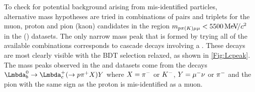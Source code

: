 

  
To check for potential background arising from mis-identified particles, alternative mass hypotheses are tried in combinations of pairs and triplets for the muon, proton and pion (kaon) candidates in the region $m_{p\pi({K})\mu\mu}<5500{\mathrm{\,Me\kern -0.1em V\!/}c^2}$ in the \Lbpi (\LbK) datasets. The only narrow mass peak that is formed by trying all of the available combinations corresponds to cascade decays involving a \Lc. These decays are most clearly visible with the BDT selection relaxed, as shown in \autoref{Fig:Lcpeak}. The \Lc mass peaks observed in the \Lbpi and \LbK datasets come from the decays $\Lb \to \Lc (\to \proton \pip X) Y$ where $X = {{\pi}^-}$ or ${{K}^-}$, $Y={\mu^-}\nu$ or ${{\pi}^-}$ and the pion with the same sign as the proton is mis-identified as a muon. 

